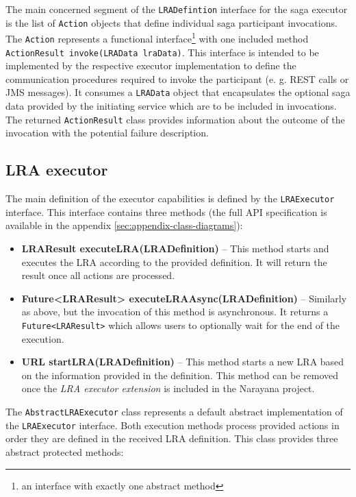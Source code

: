 \documentclass[oneside,
  digital, %
  table,   %
  lof,     %
  lot,     %
]{fithesis3}
\begin{document}
The main concerned segment of the \texttt{LRADefintion} interface for the saga executor is the list of \texttt{Action} objects that define individual saga participant invocations. The \texttt{Action} represents a functional interface\footnote{an interface with exactly one abstract method} with one included method \texttt{ActionResult invoke(LRAData lraData)}. This interface is intended to be implemented by the respective executor implementation to define the communication procedures required to invoke the participant (e. g. REST calls or JMS messages). It consumes a \texttt{LRAData} object that encapsulates the optional saga data provided by the initiating service which are to be included in invocations. The returned \texttt{ActionResult} class provides information about the outcome of the invocation with the potential failure description.

\subsection{LRA executor}

The main definition of the executor capabilities is defined by the \texttt{LRAExecutor} interface. This interface contains three methods (the full API specification is available in the appendix \ref{sec:appendix-class-diagrams}):

\begin{itemize}
    \item \textbf{LRAResult executeLRA(LRADefinition)} -- This method starts and executes the LRA according to the provided definition. It will return the result once all actions are processed.
    
    \item \textbf{Future<LRAResult> executeLRAAsync(LRADefinition)} -- Similarly as above, but the invocation of this method is asynchronous. It returns a \texttt{Future<LRAResult>} which allows users to optionally wait for the end of the execution.
    
    \item \textbf{URL startLRA(LRADefinition)} -- This method starts a new LRA based on the information provided in the definition. This method can be removed once the \textit{LRA executor extension} is included in the Narayana project.
\end{itemize}

The \texttt{AbstractLRAExecutor} class represents a default abstract implementation of the \texttt{LRAExecutor} interface. Both execution methods process provided actions in order they are defined in the received LRA definition. This class provides three abstract protected methods:
\end{document}
